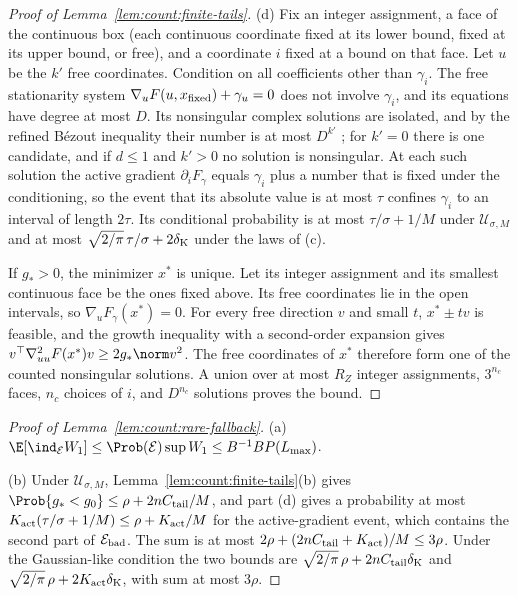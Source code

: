 \begin{proof}[Proof of Lemma~\ref{lem:count:finite-tails}]
(d) Fix an integer assignment, a face of the continuous box (each continuous
coordinate fixed at its lower bound, fixed at its upper bound, or free), and
a coordinate $i$ fixed at a bound on that face. Let $u$ be the $k'$ free
coordinates. Condition on all coefficients other than $\gamma_i$. The free
stationarity system $\nabla_uF(u,x_{\rm fixed})+\gamma_u=0$ does not involve
$\gamma_i$, and its equations have degree at most $D$. Its nonsingular complex
solutions are isolated, and by the refined B\'ezout inequality their number is
at most $D^{k'}$ \cite{fulton1998-intersection-theory}; for $k'=0$ there is
one candidate, and if $d\le1$ and $k'>0$ no solution is nonsingular. At each
such solution the active gradient $\partial_iF_\gamma$ equals $\gamma_i$ plus
a number that is fixed under the conditioning, so the event that its absolute
value is at most $\tau$ confines $\gamma_i$ to an interval of length $2\tau$.
Its conditional probability is at most $\tau/\sigma+1/M$ under
$\mathcal U_{\sigma,M}$ and at most $\sqrt{2/\pi}\,\tau/\sigma+2\delta_{\rm K}$
under the laws of (c).

If $g_*>0$, the minimizer $x^*$ is unique. Let its integer assignment and
its smallest continuous face be the ones fixed above. Its free coordinates lie
in the open intervals, so $\nabla_uF_\gamma(x^*)=0$. For every free direction
$v$ and small $t$, $x^*\pm tv$ is feasible, and the growth inequality with a
second-order expansion gives $v^\top\nabla_{uu}^2F(x^*)v\ge2g_*\norm v^2$. The
free coordinates of $x^*$ therefore form one of the counted nonsingular
solutions. A union over at most $R_Z$ integer assignments, $3^{n_c}$ faces,
$n_c$ choices of $i$, and $D^{n_c}$ solutions proves the bound.
\end{proof}

\begin{proof}[Proof of Lemma~\ref{lem:count:rare-fallback}]
(a) $\E[\ind_{\mathcal E}W_1]\le\Prob(\mathcal E)\sup W_1\le B^{-1}BP(L_{\max})$.

(b) Under $\mathcal U_{\sigma,M}$, Lemma~\ref{lem:count:finite-tails}(b) gives
$\Prob\{g_*<g_0\}\le\rho+2nC_{\rm tail}/M$, and part (d) gives a probability
at most $K_{\rm act}(\tau/\sigma+1/M)\le\rho+K_{\rm act}/M$ for the
active-gradient event, which contains the second part of
$\mathcal E_{\rm bad}$. The sum is at most $2\rho+(2nC_{\rm tail}+K_{\rm act})/M\le3\rho$.
Under the Gaussian-like condition the two bounds are
$\sqrt{2/\pi}\,\rho+2nC_{\rm tail}\delta_{\rm K}$ and
$\sqrt{2/\pi}\,\rho+2K_{\rm act}\delta_{\rm K}$, with sum at most $3\rho$.
\end{proof}

